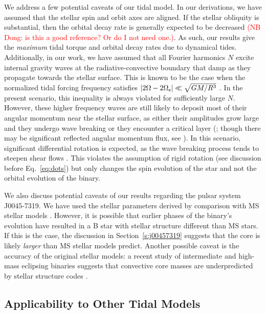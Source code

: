 \documentclass[
        fleqn,
        usenatbib,
    ]{mnras}
\newcommand*{\abs}[1]{\left|#1\right|}
\begin{document}
We address a few potential caveats of our tidal model. In our derivations, we
have assumed that the stellar spin and orbit axes are aligned. If the stellar
obliquity is substantial, then the orbital decay rate is generally expected to
be decreased \citep[see e.g.][]{lai2012tidal} \textcolor{red}{(NB Dong: is this
a good reference? Or do I not need one.)}. As such, our results give the
\emph{maximum} tidal torque and orbital decay rates due to dynamical tides.
Additionally, in our work, we have assumed that all Fourier harmonics $N$ excite
internal gravity waves at the radiative-convective boundary that damp as they
propagate towards the stellar surface. This is known to be the case when the
normalized tidal forcing frequency satisfies $\abs{2\Omega - 2\Omega_{\rm s}}
\ll \sqrt{GM / R^3}$ \citep{zahn1975dynamical, kushnir}. In the present
scenario, this inequality is always violated for sufficiently large $N$.
However, these higher frequency waves are still likely to deposit most of their
angular momentum near the stellar surface, as either their amplitudes grow large
and they undergo wave breaking or they encounter a critical layer
(\citealp{goldreich1989tidal}; though there may be significant reflected angular
momentum flux, see \citealp{su2020}). In this scenario, significant differential
rotation is expected, as the wave breaking process tends to steepen shear flows
\citep{su2020}. This violates the assumption of rigid rotation (see discussion
before Eq.~\ref{eq:dots}) but only changes the spin evolution of the star and
not the orbital evolution of the binary.

We also discuss potential caveats of our results regarding the pulsar system
J0045-7319. We have used the stellar parameters derived by comparison with MS
stellar models \citep{kumar1998}. However, it is possible that earlier phases of
the binary's evolution have resulted in a B star with stellar structure
different than MS stars. If this is the case, the discussion in
Section~\ref{s:j00457319} suggests that the core is likely \emph{larger} than MS
stellar models predict. Another possible caveat is the accuracy of the original
stellar models: a recent study of intermediate and high-mass eclipsing binaries
suggests that convective core masses are underpredicted by stellar structure
codes \citep{larger_conv_masses}.

\subsection{Applicability to Other Tidal Models}
\end{document}
